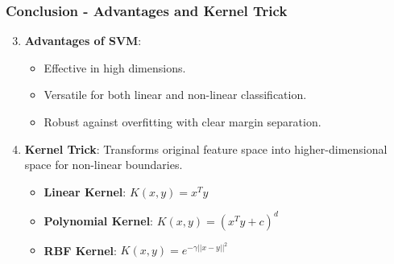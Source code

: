 \documentclass{beamer}
\begin{document}
\begin{frame}[fragile]
    \frametitle{Conclusion - Advantages and Kernel Trick}

    \begin{enumerate}
        \setcounter{enumi}{2}
        \item \textbf{Advantages of SVM}:
        \begin{itemize}
            \item Effective in high dimensions.
            \item Versatile for both linear and non-linear classification.
            \item Robust against overfitting with clear margin separation.
        \end{itemize}

        \item \textbf{Kernel Trick}: 
        Transforms original feature space into higher-dimensional space for non-linear boundaries.
        \begin{itemize}
            \item \textbf{Linear Kernel}: \( K(x, y) = x^T y \)
            \item \textbf{Polynomial Kernel}: \( K(x, y) = (x^T y + c)^d \)
            \item \textbf{RBF Kernel}: \( K(x, y) = e^{-\gamma ||x - y||^2} \)
        \end{itemize}
    \end{enumerate}
\end{frame}
\end{document}

